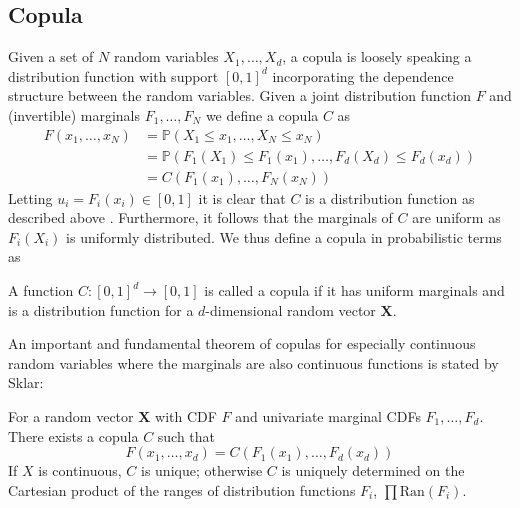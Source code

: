 \documentclass[../Thesis.tex]{subfiles}
\begin{document}
\subsection{Copula}
Given a set of $N$ random variables $X_1,\dots, X_d$, a copula is loosely speaking a distribution function with support $[0,1]^d$ incorporating the dependence structure between the random variables. Given a joint distribution function $F$ and (invertible) marginals $F_1,\dots,F_N$ we define a copula $C$ as
\begin{align*}
    F(x_1,\dots,x_N) & = \mathbb{P}\left(X_1\leq x_1,\dots, X_N\leq x_N\right)                                                                 \\
                     & = \mathbb{P}\left(F_1\left(X_1\right)\leq F_1\left(x_1\right),\dots, F_d\left(X_d\right)\leq F_d\left(x_d\right)\right) \\
                     & = C\left(F_1\left(x_1\right),\dots,F_N\left(x_N\right)\right)
\end{align*}
Letting $u_i = F_i\left(x_i\right) \in [0,1]$ it is clear that $C$ is a distribution function as described above \cite{Copula-handbook}. Furthermore, it follows that the marginals of $C$ are uniform as $F_i\left(X_i\right)$ is uniformly distributed. We thus define a copula in probabilistic terms as
\begin{definition}[Copula]\label{def:copula}
    A function $C:[0,1]^d \to [0,1]$ is called a copula if it has uniform marginals and is a distribution function for a $d$-dimensional random vector $\mathbf{X}$.
\end{definition}
An important and fundamental theorem of copulas for especially continuous random variables where the marginals are also continuous functions is stated by Sklar:
\begin{theorem} \label{thm: Sklar}
    For a random vector $\boldsymbol X$ with CDF $F$ and univariate marginal CDFs $F_1, \dots, F_d$. There exists a copula $C$ such that
    \begin{equation}\label{eq:sklar}
        F(x_1,\dots,x_d) = C(F_1(x_1), \dots, F_d(x_d))
    \end{equation}
    If $X$ is continuous, $C$ is unique; otherwise $C$ is uniquely determined on the Cartesian product of the ranges of distribution functions $F_i$, $\prod \text{Ran}\left(F_i\right)$.
\end{theorem}
\end{document}
